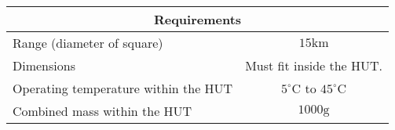 \footnotesize
\begin{tabular}{|l|c|}
	\hline
	\multicolumn{2}{|c|}{\textbf{Requirements}} \\
 	\hline
 	Range (diameter of square) & $15\mathrm{km}$ \\
	Dimensions & Must fit inside the HUT. \\
	Operating temperature within the HUT & $5^\circ \mathrm{C}$ to $45^\circ \mathrm{C}$ \\
	Combined mass within the HUT & $1000\mathrm{g}$ \\
 	\hline
\end{tabular}